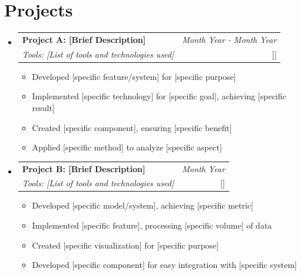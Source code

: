 \documentclass[a4paper,11pt]{article}
\makeatletter
\newcommand{\resumeProject}[4]{
\vspace{0.5mm}\item
    \begin{tabular*}{0.98\textwidth}[t]{l@{\extracolsep{\fill}}r}
        \textbf{#1} & \textit{\footnotesize{#3}} \\
        \footnotesize{\textit{#2}} & \footnotesize{#4}
    \end{tabular*}
    \vspace{-2.4mm}
}
\newcommand{\resumeSubHeadingListStart}{\begin{itemize}[leftmargin=*,labelsep=1mm]}
\newcommand{\resumeItemListStart}{\begin{itemize}[leftmargin=*,labelsep=1mm,itemsep=0.5mm]}
\newcommand{\resumeSubHeadingListEnd}{\end{itemize}\vspace{2mm}}
\newcommand{\resumeItemListEnd}{\end{itemize}\vspace{-2mm}}
\makeatother
\begin{document}
\vspace{-6mm}

\section{\textbf{Projects}}
\vspace{-0.4mm}
\resumeSubHeadingListStart

\resumeProject
  {Project A: [Brief Description]}
  {Tools: [List of tools and technologies used]}
  {Month Year - Month Year}
  {{}[\href{https://github.com/your-username/project-a}{\textcolor{darkblue}{\faGithub}}]}
\resumeItemListStart
  \item Developed [specific feature/system] for [specific purpose]
  \item Implemented [specific technology] for [specific goal], achieving [specific result]
  \item Created [specific component], ensuring [specific benefit]
  \item Applied [specific method] to analyze [specific aspect]
\resumeItemListEnd

\resumeProject
  {Project B: [Brief Description]}
  {Tools: [List of tools and technologies used]}
  {Month Year}
  {{}[\href{https://github.com/your-username/project-b}{\textcolor{darkblue}{\faGithub}}]}
\resumeItemListStart
  \item Developed [specific model/system], achieving [specific metric]
  \item Implemented [specific feature], processing [specific volume] of data
  \item Created [specific visualization] for [specific purpose]
  \item Developed [specific component] for easy integration with [specific system]
\resumeItemListEnd

\resumeSubHeadingListEnd
\end{document}
